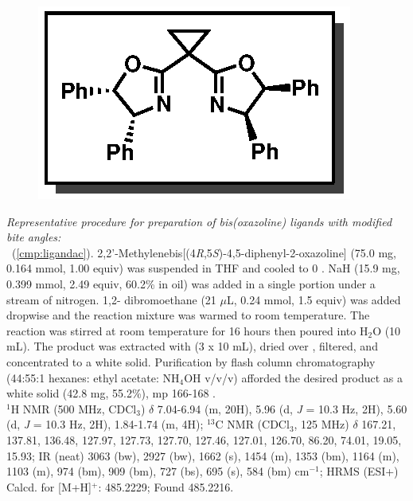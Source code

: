 \vspace{10pt}
\begin{figure}
  \vspace{-20pt}
  \begin{center}
    \includegraphics[scale=0.8]{chp_asymmetric/images/ligandac}
  \end{center}
  \vspace{-35pt}
\end{figure}
\noindent \textit{Representative procedure for preparation of bis(oxazoline)
ligands with modified bite angles:}\\\textbf{\CMPligandac}\ (\ref{cmp:ligandac}).
2,2'-Methylenebis[(4\textit{R},5\textit{S})-4,5-diphenyl-2-oxazoline] (75.0 mg, 0.164 mmol, 1.00 equiv) was suspended in THF and cooled to 0 \degc. NaH (15.9 mg, 0.399 mmol, 2.49 equiv, 60.2\% in oil) was added in a single portion under a stream of nitrogen. 1,2- dibromoethane (21 $\mu$L, 0.24 mmol, 1.5 equiv) was added dropwise and the reaction mixture was warmed to room temperature. The reaction was stirred at room temperature for 16 hours then poured into H$_2$O (10 mL). The product was extracted
with  (3 x 10 mL), dried over , filtered, and concentrated to a white solid.
Purification by flash column chromatography (44:55:1 hexanes: ethyl acetate: NH$_4$OH v/v/v)
afforded the desired product as a white solid (42.8 mg, 55.2\%), mp 166-168 \degc. \\
$^1$H NMR (500 MHz, CDCl$_3$) $\delta$ 7.04-6.94 (m, 20H), 5.96 (d, \textit{J} =  10.3 Hz, 2H), 5.60
(d, \textit{J} =  10.3 Hz, 2H), 1.84-1.74 (m, 4H); $^{13}$C NMR (CDCl$_3$, 125 MHz) $\delta$ 167.21, 137.81,
136.48, 127.97, 127.73, 127.70, 127.46, 127.01, 126.70, 86.20, 74.01, 19.05, 15.93; IR (neat) 3063 (bw), 2927 (bw), 1662 (s), 1454 (m), 1353 (bm), 1164 (m), 1103
(m), 974 (bm), 909 (bm), 727 (bs), 695 (s), 584 (bm) cm$^{-1}$; HRMS (ESI+) Calcd. for
 [M+H]$^+$: 485.2229; Found 485.2216.

